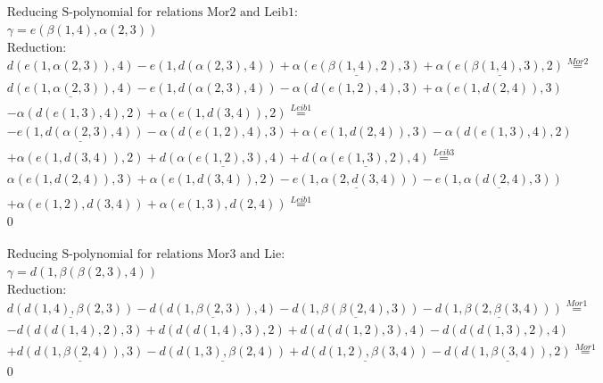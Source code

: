 \documentclass[11pt]{amsart}
\begin{document}
\begin{align*} 
& \text{Reducing S-polynomial for relations Mor2 and Leib1:} \\ 
& \gamma = e(\beta(1,4),\alpha(2,3)) \\ 
& \text{Reduction}: \\&d(e(1,\alpha(2,3)),4) - e(1,d(\alpha(2,3),4)) + \underline{\alpha(e(\beta(1,4),2),3)} + \underline{\alpha(e(\beta(1,4),3),2)} \stackrel{ Mor2 }{=}  \\ 
&\underline{d(e(1,\alpha(2,3)),4)} - e(1,d(\alpha(2,3),4)) - \alpha(d(e(1,2),4),3) + \alpha(e(1,d(2,4)),3)\\ 
 &  - \alpha(d(e(1,3),4),2) + \alpha(e(1,d(3,4)),2) \stackrel{ Leib1 }{=}  \\ 
& - \underline{e(1,d(\alpha(2,3),4))} - \alpha(d(e(1,2),4),3) + \alpha(e(1,d(2,4)),3) - \alpha(d(e(1,3),4),2)\\ 
 &  + \alpha(e(1,d(3,4)),2) + \underline{d(\alpha(e(1,2),3),4)} + \underline{d(\alpha(e(1,3),2),4)} \stackrel{ Leib3 }{=}  \\ 
&\alpha(e(1,d(2,4)),3) + \alpha(e(1,d(3,4)),2) - \underline{e(1,\alpha(2,d(3,4)))} - \underline{e(1,\alpha(d(2,4),3))}\\ 
 &  + \alpha(e(1,2),d(3,4)) + \alpha(e(1,3),d(2,4)) \stackrel{ Leib1 }{=}  \\ 
&0\\ 
\end{align*} 
 
\begin{align*} 
& \text{Reducing S-polynomial for relations Mor3 and Lie:} \\ 
& \gamma = d(1,\beta(\beta(2,3),4)) \\ 
& \text{Reduction}: \\&\underline{d(d(1,4),\beta(2,3))} - \underline{d(d(1,\beta(2,3)),4)} - \underline{d(1,\beta(\beta(2,4),3))} - \underline{d(1,\beta(2,\beta(3,4)))} \stackrel{ Mor1 }{=}  \\ 
& - d(d(d(1,4),2),3) + d(d(d(1,4),3),2) + d(d(d(1,2),3),4) - d(d(d(1,3),2),4)\\ 
 &  + \underline{d(d(1,\beta(2,4)),3)} - \underline{d(d(1,3),\beta(2,4))} + \underline{d(d(1,2),\beta(3,4))} - \underline{d(d(1,\beta(3,4)),2)} \stackrel{ Mor1 }{=}  \\ 
&0\\ 
\end{align*} 
 
\end{document}
